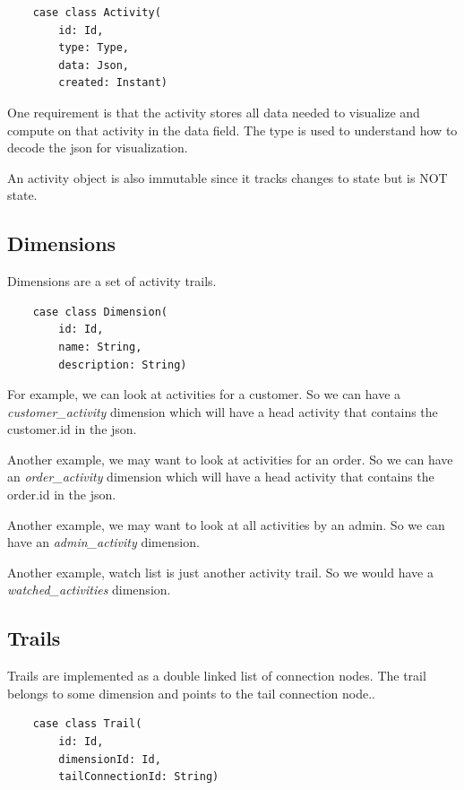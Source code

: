 \documentclass[11pt]{article}
\begin{document}
\begin{lstlisting}
    case class Activity(
        id: Id, 
        type: Type, 
        data: Json, 
        created: Instant)
\end{lstlisting}

One requirement is that the activity stores all data needed to visualize and compute on that activity in the data field. 
The type is used to understand how to decode the json for visualization.

An activity object is also immutable since it tracks changes to state but is NOT state.

\subsection{Dimensions}

Dimensions are a set of activity trails. 

\begin{lstlisting}
    case class Dimension(
        id: Id, 
        name: String, 
        description: String)
\end{lstlisting}

For example, we can look at activities for a customer. So we can have a \emph{customer\_activity}
dimension which will have a head activity that contains the customer.id in the json.

Another example, we may want to look at activities for an order. So we can have an \emph{order\_activity}
dimension which will have a head activity that contains the order.id in the json.

Another example, we may want to look at all activities by an admin. So we can have an \emph{admin\_activity}
dimension.

Another example, watch list is just another activity trail. So we would have a \emph{watched\_activities}
dimension. 

\subsection{Trails}

Trails are implemented as a double linked list of connection nodes. The trail belongs to 
some dimension and points to the tail connection node..

\begin{lstlisting}
    case class Trail(
        id: Id, 
        dimensionId: Id,
        tailConnectionId: String)
\end{lstlisting}
\end{document}
